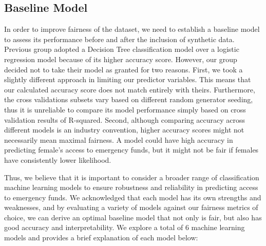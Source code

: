 \documentclass[12pt]{article}
\begin{document}
\hypertarget{baseline-model}{%
\subsection{Baseline Model}\label{baseline-model}}

In order to improve fairness of the dataset, we need to establish a
baseline model to assess its performance before and after the inclusion
of synthetic data. Previous group adopted a Decision Tree classification
model over a logistic regression model because of its higher accuracy
score. However, our group decided not to take their model as granted for
two reasons. First, we took a slightly different approach in limiting
our predictor variables. This means that our calculated accuracy score
does not match entirely with theirs. Furthermore, the cross validations
subsets vary based on different random generator seeding, thus it is
unreliable to compare its model performance simply based on cross
validation results of R-squared. Second, although comparing accuracy
across different models is an industry convention, higher accuracy
scores might not necessarily mean maximal fairness. A model could have
high accuracy in predicting female's access to emergency funds, but it
might not be fair if females have consistently lower likelihood.

Thus, we believe that it is important to consider a broader range of
classification machine learning models to ensure robustness and
reliability in predicting access to emergency funds. We acknowledged
that each model has its own strengths and weaknesses, and by evaluating
a variety of models against our fairness metrics of choice, we can
derive an optimal baseline model that not only is fair, but also has
good accuracy and interpretability. We explore a total of 6 machine
learning models and provides a brief explanation of each model below:
\end{document}
